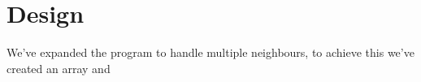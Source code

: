 \section{Design}
We've expanded the program to handle multiple neighbours, to achieve this we've created an array and 
